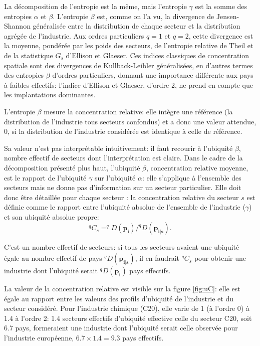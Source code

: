 \documentclass[fleqn,10pt]{ArtEcoFoG} %
\begin{document}
La décomposition de l'entropie est la même, mais l'entropie \(\gamma\)
est la somme des entropies \(\alpha\) et \(\beta\). L'entropie \(\beta\)
est, comme on l'a vu, la divergence de Jensen-Shannon généralisée entre
la distribution de chaque secteur et la distribution agrégée de
l'industrie. Aux ordres particuliers \(q=1\) et \(q=2\), cette
divergence est la moyenne, pondérée par les poids des secteurs, de
l'entropie relative de Theil et de la statistique \(G_s\) d'Ellison et
Glaeser. Ces indices classiques de concentration spatiale sont des
divergences de Kullback-Leibler généralisées, en d'autres termes des
entropies \(\beta\) d'ordres particuliers, donnant une importance
différente aux pays à faibles effectifs: l'indice d'Ellison et Glaeser,
d'ordre 2, ne prend en compte que les implantations dominantes.

L'entropie \(\beta\) mesure la concentration relative: elle intègre une
référence (la distribution de l'industrie tous secteurs confondus) et a
donc une valeur attendue, 0, si la distribution de l'industrie
considérée est identique à celle de référence.

Sa valeur n'est pas interprétable intuitivement: il faut recourir à
l'ubiquité \(\beta\), nombre effectif de secteurs dont l'interprétation
est claire. Dans le cadre de la décomposition présenté plus haut,
l'ubiquité \(\beta\), concentration relative moyenne, est le rapport de
l'ubiquité \(\gamma\) sur l'ubiquité \(\alpha\): elle s'applique à
l'ensemble des secteurs mais ne donne pas d'information sur un secteur
particulier. Elle doit donc être détaillée pour chaque secteur : la
concentration relative du secteur \(s\) est définie comme le rapport
entre l'ubiquité absolue de l'ensemble de l'industrie (\(\gamma\)) et
son ubiquité absolue propre:
\[^{q}C_{s} = ^{q}D(\mathbf{p_{i}}) / ^{q}D(\mathbf{p_{i|s}}).\]

C'est un nombre effectif de secteurs: si tous les secteurs avaient une
ubiquité égale au nombre effectif de pays \(^{q}D(\mathbf{p_{i|s}})\),
il en faudrait \(^{q}C_{s}\) pour obtenir une industrie dont l'ubiquité
serait \(^{q}D(\mathbf{p_{i}})\) pays effectifs.

La valeur de la concentration relative est visible sur la figure
\ref{fig:uC}: elle est égale au rapport entre les valeurs des profils
d'ubiquité de l'industrie et du secteur considéré. Pour l'industrie
chimique (C20), elle varie de 1 (à l'ordre 0) à 1.4 à l'ordre 2: 1.4
secteurs effectifs d'ubiquité effective celle du secteur C20, soit 6.7
pays, formeraient une industrie dont l'ubiquité serait celle observée
pour l'industrie européenne, \(6.7 \times 1.4 = 9.3\) pays effectifs.
\end{document}
